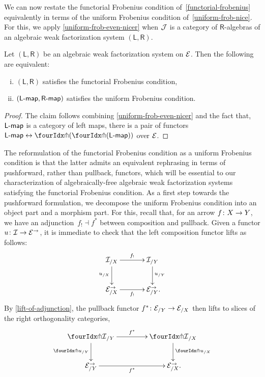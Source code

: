 \documentclass[reqno,10pt,a4paper,oneside,draft]{amsart}
\newcommand{\LL}{\mathsf{L}}
\newcommand{\RR}{\mathsf{R}}
\begin{document}
{{We can now restate the functorial Frobenius condition of~\cref{functorial-frobenius} equivalently in terms of
the uniform Frobenius condition of~\cref{uniform-frob-nice}. For this, we apply \cref{uniform-frob-even-nicer}
when $\cal{J}$ is a category of $\RR$-algebras of an algebraic weak factorization system $(\LL, \RR)$. 

\begin{proposition}
Let $(\mathsf{L}, \mathsf{R})$ be an algebraic weak factorization system on $\cal{E}$. Then the following are
equivalent:
\begin{enumerate}[(i)] 
\item $(\LL, \RR)$ satisfies the functorial Frobenius condition,
\item $(\pcoalg{\LL}, \palg{\RR})$ satisfies the uniform Frobenius condition.
\end{enumerate}
\end{proposition}

\begin{proof} The claim follows combining \cref{uniform-frob-even-nicer} and the fact that, $\pcoalg{\LL}$ is a category of left maps,
there is a pair of functors $\pcoalg{\LL} \leftrightarrow \liftl{(\liftr{(\pcoalg{\LL})})}$ over $\cal{E}$.
\end{proof}


The reformulation of the functorial Frobenius condition as a uniform Frobenius condition is that the latter admits an 
equivalent rephrasing in terms of pushforward, rather than pullback, functors, which will be essential to our characterization of algebraically-free
algebraic weak factorization systems satisfying the functorial Frobenius condition. As a first step towards the pushforward formulation,
we decompose the uniform Frobenius condition into an object part and a morphism part. For this, recall that, for an arrow $f \co X \to Y$, we have an adjunction~$f_{!} \dashv f^*$ between composition and pullback. 
Given a functor $u \co \cal{I} \to \catE^\to$, it is immediate to check that the left composition functor lifts as follows:
\[
\xymatrix@C+1em{
  \cal{I}_{/X}
  \ar[r]^-{f_!}
  \ar[d]_{u_{/X}}
&
  \cal{I}_{/Y}
  \ar[d]^{u_{/Y}}
\\
  \calE_{/X}^\to
  \ar[r]_-{f_!}
&
  \calE_{/Y}^\to
\rlap{.}}
\]
By \cref{lift-of-adjunction}, the pullback functor $f^* \co \catE_{/Y} \to \catE_{/X}$ then lifts to slices of the right orthogonality categories,
\[
\xymatrix@C=1.5cm{
  \liftr{\cal{I}}_{/Y}
  \ar[d]_{{\liftr{u}}_{/Y}}
  \ar[r]^{f^*}
&
  \liftr{\cal{I}}_{/X}
  \ar[d]^{{\liftr{u}}_{/X}}
\\
  {\catE}_{/Y}^\to
  \ar[r]_{f^*}
&
  \catE_{/X}^\to
\rlap{.}}
\]






}}
\end{document}
